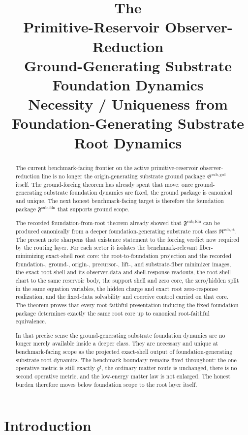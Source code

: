 \documentclass[11pt]{article}
\title{\textbf{The \TheoryName{}}\\[0.4em]
\large Primitive-Reservoir Observer-Reduction\\
\large Ground-Generating Substrate Foundation Dynamics\\
\large Necessity / Uniqueness from\\
\large Foundation-Generating Substrate Root Dynamics}
\author{}
\date{}
\newcommand{\CompletedMetric}{g^{\sharp}}
\newcommand{\GroundPackage}{\mathfrak G^{\mathrm{sub,grd}}}
\newcommand{\FoundationPackage}{\mathfrak F^{\mathrm{sub,fdn}}}
\newcommand{\RootPackage}{\mathfrak R^{\mathrm{sub,rt}}}
\begin{document}
\maketitle

\begin{abstract}
The current benchmark-facing frontier on the active primitive-reservoir observer-reduction line is no longer the origin-generating substrate ground package \(\GroundPackage\) itself. The ground-forcing theorem has already spent that move: once ground-generating substrate foundation dynamics are fixed, the ground package is canonical and unique. The next honest benchmark-facing target is therefore the foundation package \(\FoundationPackage\) that supports ground scope.

The recorded foundation-from-root theorem already showed that \(\FoundationPackage\) can be produced canonically from a deeper foundation-generating substrate root class \(\RootPackage\). The present note sharpens that existence statement to the forcing verdict now required by the routing layer. For each sector it isolates the benchmark-relevant fiber-minimizing exact-shell root core: the root-to-foundation projection and the recorded foundation-, ground-, origin-, precursor-, lift-, and substrate-fiber minimizer images, the exact root shell and its observer-data and shell-response readouts, the root shell chart to the same reservoir body, the support shell and zero core, the zero/hidden split in the same equation variables, the hidden charge and exact root zero-response realization, and the fixed-data solvability and coercive control carried on that core. The theorem proves that every root-faithful presentation inducing the fixed foundation package determines exactly the same root core up to canonical root-faithful equivalence.

In that precise sense the ground-generating substrate foundation dynamics are no longer merely available inside a deeper class. They are necessary and unique at benchmark-facing scope as the projected exact-shell output of foundation-generating substrate root dynamics. The benchmark boundary remains fixed throughout: the one operative metric is still exactly \(\CompletedMetric\), the ordinary matter route is unchanged, there is no second operative metric, and the low-energy matter law is not enlarged. The honest burden therefore moves below foundation scope to the root layer itself.
\end{abstract}

\section{Introduction}
\end{document}
